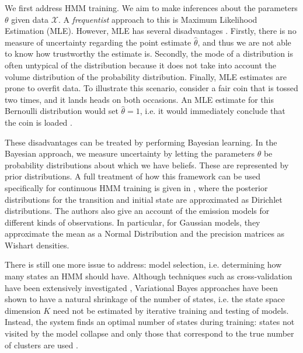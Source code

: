 \documentclass[pdftex,11pt,a4paper]{article}
\theoremstyle{definition}
\theoremstyle{remark}
\begin{document}
\par We first address HMM training. We aim to make inferences about the parameters $\theta$ given data $\mathcal{X}$. A \emph{frequentist} approach to this is Maximum Likelihood Estimation (MLE). However, MLE has several disadvantages \cite{Murphy2012}. Firstly, there is no measure of uncertainty regarding the point estimate $\hat{\theta}$, and thus we are not able to know how trustworthy the estimate is. Secondly, the mode of a distribution is often untypical of the distribution \cite{Murphy2012} because it does not take into account the volume distribution of the probability distribution. Finally, MLE estimates are prone to overfit data. To illustrate this scenario, consider a fair coin that is tossed two times, and it lands heads on both occasions. An MLE estimate for this Bernoulli distribution would set $\hat{\theta} = 1$, i.e. it would immediately conclude that the coin is loaded \cite{Murphy2012}.
\par These disadvantages can be treated by performing Bayesian learning. In the Bayesian approach, we measure uncertainty by letting the parameters $\theta$ be probability distributions about which we have beliefs. These are represented by prior distributions. A full treatment of how this framework can be used specifically for continuous HMM training is given in \cite{Rezek2005}, where the posterior distributions for the transition and initial state are approximated as Dirichlet distributions. The authors also give an account of the emission models for different kinds of observations. In particular, for Gaussian models, they approximate the mean as a Normal Distribution and the precision matrices as Wishart densities. 
\par There is still one more issue to address: model selection, i.e. determining how many states an HMM should have. Although techniques such as cross-validation have been extensively investigated \cite{Siddiqi2007,Rezek2005}, Variational Bayes approaches have been shown to have a natural shrinkage of the number of states, i.e. the state space dimension $K$ need not be estimated by iterative training and testing of models. Instead, the system finds an optimal number of states during training: states not visited by the model collapse and only those that correspond to the true number of clusters are used \cite{Rezek2005}. 
\end{document}
